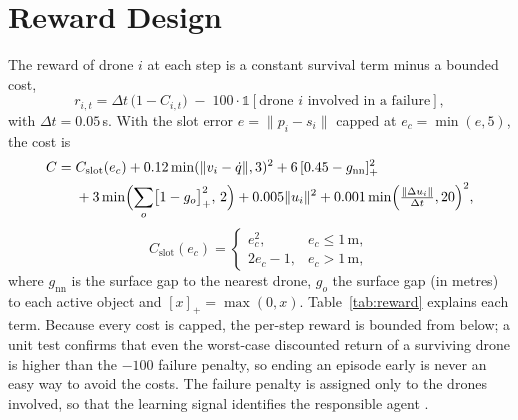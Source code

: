 \section{Reward Design}
The reward of drone $i$ at each step is a constant survival term minus a bounded cost,
\begin{equation}
  r_{i,t} = \Delta t\,\bigl(1 - C_{i,t}\bigr) \;-\; 100\cdot\mathbb{1}\!\left[\text{drone } i \text{ involved in a failure}\right],
  \label{eq:reward}
\end{equation}
with $\Delta t = 0.05$\,s. With the slot error $e = \lVert p_i - s_i\rVert$ capped at $e_c = \min(e, 5)$, the
cost is
\begin{equation}
\begin{aligned}
  C ={}& C_{\mathrm{slot}}(e_c) + 0.12\min(\lVert v_i - \dot q\rVert, 3)^2 + 6\,[0.45 - g_{\mathrm{nn}}]_+^2 \\
      &+ 3\min\Bigl(\sum_{o}\bigl[1 - g_o\bigr]_+^2,\, 2\Bigr) + 0.005\lVert u_i\rVert^2
      + 0.001\min\Bigl(\tfrac{\lVert \Delta u_i\rVert}{\Delta t}, 20\Bigr)^2,
\end{aligned}
  \label{eq:cost}
\end{equation}
\begin{equation}
  C_{\mathrm{slot}}(e_c) = \begin{cases} e_c^2, & e_c \le 1\,\text{m},\\ 2e_c - 1, & e_c > 1\,\text{m},\end{cases}
  \label{eq:slotcost}
\end{equation}
where $g_{\mathrm{nn}}$ is the surface gap to the nearest drone, $g_o$ the surface gap (in metres) to each active object
and $[x]_+=\max(0,x)$. Table~\ref{tab:reward} explains each term. Because every cost is capped, the per-step
reward is bounded from below; a unit test confirms that even the worst-case discounted return of a surviving
drone is higher than the $-100$ failure penalty, so ending an episode early is never an easy way to avoid the
costs. The failure penalty is assigned only to the drones involved, so that the learning signal identifies the
responsible agent \cite{batra2021decentralized}.

